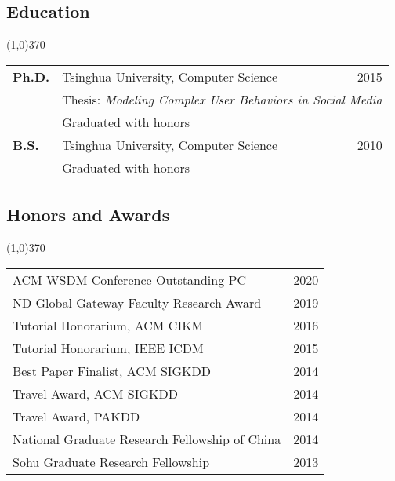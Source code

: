 \documentclass[10pt]{article}
\newcounter{list}
\begin{document}
\vspace{-0.2cm}
\subsection{\sc Education}
\vspace{-0.4cm} \line(1,0){370} \vspace{-0.1cm}

\begin{table}[h!]
\begin{tabular*}{12.7cm}{p{1.15cm}p{10.00cm}r}
\bf{Ph.D.}&Tsinghua University, Computer Science&2015\\
 &\multicolumn{2}{l}{\small Thesis: \emph{Modeling Complex User Behaviors in Social Media}}\\
 &\multicolumn{2}{l}{\small Graduated with honors}\\	
\bf{B.S.}&Tsinghua University, Computer Science&2010\\
 &\multicolumn{2}{l}{\small Graduated with honors}\\	

\end{tabular*}
\end{table}

\vspace{-0.6cm}
\subsection{\sc Honors and Awards}
\vspace{-0.4cm} \line(1,0){370} \vspace{-0.1cm}

\begin{table}[h!]
\begin{tabular*}{12.7cm}{p{11.65cm}r}
ACM WSDM Conference Outstanding PC&2020 \\
ND Global Gateway Faculty Research Award&2019 \\
Tutorial Honorarium, ACM CIKM&2016 \\
Tutorial Honorarium, IEEE ICDM&2015 \\
Best Paper Finalist, ACM SIGKDD&2014 \\
Travel Award, ACM SIGKDD&2014 \\
Travel Award, PAKDD&2014 \\
National Graduate Research Fellowship of China&2014 \\
Sohu Graduate Research Fellowship&2013 \\
\end{tabular*}
\end{table}
\end{document}
